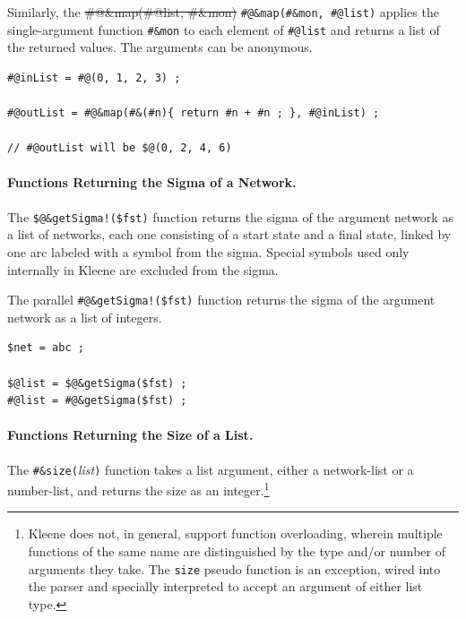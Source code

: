 \documentclass[letterpaper,12pt]{article}
\begin{document}
\begin{samepage}
\begin{changebar}

Similarly, the \sout{\#@\&map(\#@list, \#\&mon)} 
\verb!#@&map(#&mon, #@list)!  applies the single-argument 
function \verb!#&mon! to each
element of \verb!#@list! and returns a list of the returned values.  The
arguments can be anonymous.

\begin{Verbatim}[fontsize=\small]
#@inList = #@(0, 1, 2, 3) ;

#@outList = #@&map(#&(#n){ return #n + #n ; }, #@inList) ;

// #@outList will be $@(0, 2, 4, 6)
\end{Verbatim}

\end{changebar}
\end{samepage}

\paragraph{Functions Returning the Sigma of a Network.}

The \verb+$@&getSigma!($fst)+ function returns the sigma of the argument
network as a list of networks, each one consisting of a start state and a final
state, linked by one arc labeled with a symbol from the sigma.  Special symbols
used only internally in Kleene are excluded from the sigma.

The parallel \verb+#@&getSigma!($fst)+ function returns the sigma of the argument
network as a list of integers.

\begin{Verbatim}[fontsize=\small]
$net = abc ;

$@list = $@&getSigma($fst) ;
#@list = #@&getSigma($fst) ;
\end{Verbatim}


\paragraph{Functions Returning the Size of a List.}


The \verb+#&size(+\textit{list}\verb!)! function takes a list argument,
either a network-list or a number-list, and returns the
size as an integer.\footnote{Kleene does not, in general, support function
overloading, wherein multiple functions of the same name are distinguished
by the type and/or number of arguments they take.
The \texttt{size} pseudo function is an exception,
wired into the parser and specially interpreted to accept an argument of either list
type.}
\end{document}
